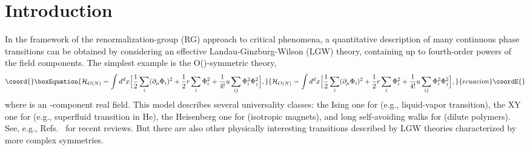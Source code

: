 \documentclass[a4paper,12pt]{article}
\begin{document}
\section{Introduction}
\label{lsec-intro}

In the framework of the renormalization-group (RG)
approach to critical phenomena,
a quantitative description of 
many continuous phase transitions  can be obtained
by considering an effective Landau-Ginzburg-Wilson (LGW) theory,
containing up to fourth-order powers of the field components.
The simplest example is the O(\coordHE{})-symmetric \coordHE{} theory,
\begin{equation}\coord{}\boxEquation{
{\cal H}_{O(N)} = \int d^d x \Bigl[ 
{1\over 2} \sum_i (\partial_\mu \Phi_{i})^2 + 
{1\over 2} r \sum_i \Phi_{i}^2  + 
{1\over 4!} u \sum_{ij} \Phi_i^2 \Phi_j^2 \Bigr], 
\label{HON}
}{
{\cal H}_{O(N)} = \int d^d x \Bigl[ 
{1\over 2} \sum_i (\partial_\mu \Phi_{i})^2 + 
{1\over 2} r \sum_i \Phi_{i}^2  + 
{1\over 4!} u \sum_{ij} \Phi_i^2 \Phi_j^2 \Bigr], 
}{ecuacion}\coordE{}\end{equation}
where \myHighlight{$\Phi$}\coordHE{} is an \coordHE{}-component real field. This model
describes several universality classes:
the Ising one for \coordHE{} 
(e.g., liquid-vapor transition), the XY one for \coordHE{}
(e.g., superfluid transition in \coordHE{}He),
the Heisenberg one for \coordHE{}
(isotropic magnets), and long self-avoiding
walks for \coordHE{}
(dilute polymers).
See, e.g., Refs.~\cite{review,Zinn-Justin-book} for 
recent reviews.
But there are  also other physically interesting 
transitions described by LGW theories
characterized by more complex symmetries.
\end{document}
